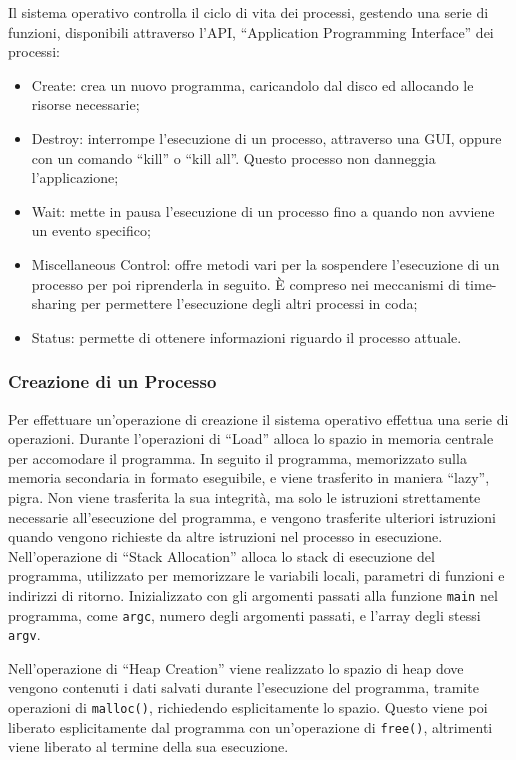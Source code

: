 \documentclass{article}
\numberwithin{equation}{subsection}
\begin{document}
Il sistema operativo controlla il ciclo di vita dei processi, gestendo una serie di funzioni, disponibili attraverso l'API, ``Application Programming Interface'' 
dei processi:
\begin{itemize}
	\item Create: crea un nuovo programma, caricandolo dal disco ed allocando le risorse necessarie;
	\item Destroy: interrompe l'esecuzione di un processo, attraverso una GUI, oppure con un comando ``kill'' o ``kill all''. Questo processo non danneggia l'applicazione;
	\item Wait: mette in pausa l'esecuzione di un processo fino a quando non avviene un evento specifico;
	\item Miscellaneous Control: offre metodi vari per la sospendere l'esecuzione di un processo per poi riprenderla in seguito. \`{E} compreso nei meccanismi di time-sharing per permettere l'esecuzione degli altri processi in coda;
	\item Status: permette di ottenere informazioni riguardo il processo attuale.  
\end{itemize}

\subsubsection{Creazione di un Processo}

Per effettuare un'operazione di creazione il sistema operativo effettua una serie di operazioni. Durante l'operazioni di ``Load'' alloca lo spazio in memoria centrale per accomodare il programma. In seguito il programma, memorizzato 
sulla memoria secondaria in formato eseguibile, e viene trasferito in maniera ``lazy'', pigra. Non viene trasferita la sua integrità, ma solo le istruzioni 
strettamente necessarie all'esecuzione del programma, e vengono trasferite ulteriori istruzioni quando vengono richieste da altre istruzioni nel processo in 
esecuzione. 
Nell'operazione di ``Stack Allocation'' alloca lo stack di esecuzione del programma, utilizzato per memorizzare le variabili locali, parametri di funzioni e indirizzi 
di ritorno. 
Inizializzato con gli argomenti passati alla funzione \verb|main| nel programma, come \verb|argc|, numero degli argomenti passati, e l'array degli stessi \verb|argv|. 

Nell'operazione di ``Heap Creation'' viene realizzato lo spazio di heap dove vengono contenuti i dati salvati durante l'esecuzione del programma, tramite operazioni 
di \verb|malloc()|, richiedendo esplicitamente lo spazio. Questo viene poi liberato esplicitamente dal programma con un'operazione di \verb|free()|, altrimenti viene 
liberato al termine della sua esecuzione. 
\end{document}
